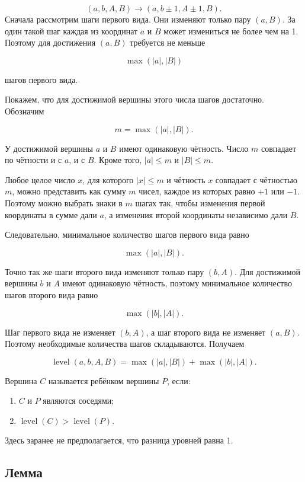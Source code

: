 $$(a,b,A,B)\to(a,b\pm1,A\pm1,B).
$$
Сначала рассмотрим шаги первого вида. Они изменяют только пару $(a,B)$.
За один такой шаг каждая из координат $a$ и $B$ может измениться не более
чем на 1. Поэтому для достижения $(a,B)$ требуется не меньше

$$
\max(|a|,|B|)
$$

шагов первого вида.

Покажем, что для достижимой вершины этого числа шагов достаточно. Обозначим

$$
m = \max(|a|,|B|).
$$

У достижимой вершины $a$ и $B$ имеют одинаковую чётность. Число $m$
совпадает по чётности и с $a$, и с $B$. Кроме того, $|a| \le m$ и
$|B| \le m$.

Любое целое число $x$, для которого $|x| \le m$ и чётность $x$ совпадает
с чётностью $m$, можно представить как сумму $m$ чисел, каждое из которых
равно $+1$ или $-1$. Поэтому можно выбрать знаки в $m$ шагах так, чтобы
изменения первой координаты в сумме дали $a$, а изменения второй
координаты независимо дали $B$.

Следовательно, минимальное количество шагов первого вида равно

$$
\max(|a|,|B|).
$$

Точно так же шаги второго вида изменяют только пару $(b,A)$. Для
достижимой вершины $b$ и $A$ имеют одинаковую чётность, поэтому
минимальное количество шагов второго вида равно

$$
\max(|b|,|A|).
$$

Шаг первого вида не изменяет $(b,A)$, а шаг второго вида не изменяет
$(a,B)$. Поэтому необходимые количества шагов складываются. Получаем

$$
\operatorname{level}(a,b,A,B) = \max(|a|,|B|) + \max(|b|,|A|).
$$

Вершина $C$ называется ребёнком вершины $P$, если:

\begin{enumerate}
\def\labelenumi{\arabic{enumi}.}
\tightlist
\item
  $C$ и $P$ являются соседями;
\item
  $\operatorname{level}(C) > \operatorname{level}(P)$.
\end{enumerate}

Здесь заранее не предполагается, что разница уровней равна 1.

\subsection{Лемма}

